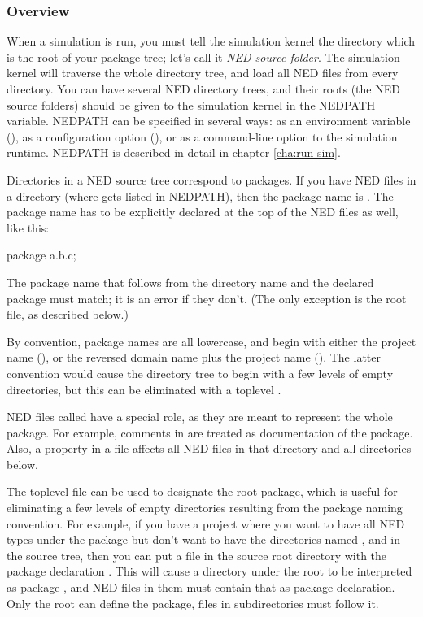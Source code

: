 \subsubsection{Overview}

When a simulation is run, you must tell the simulation kernel the
directory which is the root of your package tree; let's call it
\textit{NED source folder}. The simulation kernel will traverse
the whole directory tree, and load all NED files from every directory.
You can have several NED directory trees, and their roots (the NED source
folders) should be given to the simulation kernel in the NEDPATH
variable. NEDPATH can be specified in several ways: as an environment
variable (), as a configuration option (),
or as a command-line option to the simulation runtime. NEDPATH is
described in detail in chapter \ref{cha:run-sim}.

Directories in a NED source tree correspond to packages. If you have
NED files in a  directory (where 
gets listed in NEDPATH), then the package name is .
The package name has to be explicitly declared at the top of the NED
files as well, like this:

\begin{ned}
package a.b.c;
\end{ned}

The package name that follows from the directory name and the declared
package must match; it is an error if they don't. (The only exception
is the root  file, as described below.)

By convention, package names are all lowercase, and begin with either
the project name (), or the reversed domain name plus the
project name (). The latter convention
would cause the directory tree to begin with a few levels of empty
directories, but this can be eliminated with a toplevel .

NED files called  have a special role, as they are meant
to represent the whole package. For example, comments in
 are treated as documentation of the package. Also, a
 property in a  file affects all NED
files in that directory and all directories below.

The toplevel  file can be used to designate the root
package, which is useful for eliminating a few levels of empty directories
resulting from the package naming convention. For example, if you have a
project where you want to have all NED types under the 
package but don't want to have the directories named ,  and
 in the source tree, then you can put a 
file in the source root directory with the package declaration
. This will cause a directory  under the
root to be interpreted as package , and NED
files in them must contain that as package declaration. Only the root
 can define the package,  files
in subdirectories must follow it.


